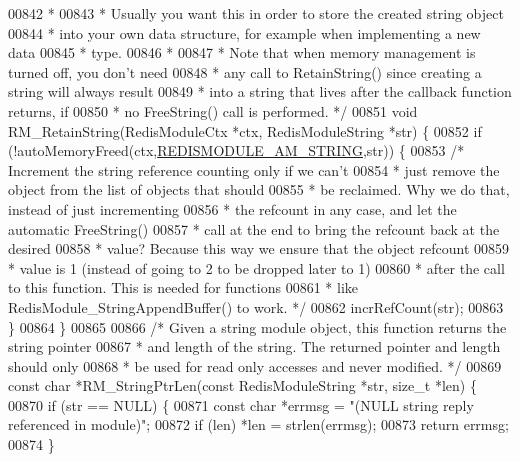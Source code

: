 \begin{DoxyCode}
{00842 \textcolor{comment}{ *}
00843 \textcolor{comment}{ * Usually you want this in order to store the created string object}
00844 \textcolor{comment}{ * into your own data structure, for example when implementing a new data}
00845 \textcolor{comment}{ * type.}
00846 \textcolor{comment}{ *}
00847 \textcolor{comment}{ * Note that when memory management is turned off, you don't need}
00848 \textcolor{comment}{ * any call to RetainString() since creating a string will always result}
00849 \textcolor{comment}{ * into a string that lives after the callback function returns, if}
00850 \textcolor{comment}{ * no FreeString() call is performed. */}
00851 \textcolor{keywordtype}{void} RM\_RetainString(RedisModuleCtx *ctx, RedisModuleString *str) \{
00852     \textcolor{keywordflow}{if} (!autoMemoryFreed(ctx,\hyperlink{module_8c_a566ace39ef8d3d16c3f7d9d6c6b8e4ef}{REDISMODULE\_AM\_STRING},str)) \{
00853         \textcolor{comment}{/* Increment the string reference counting only if we can't}
00854 \textcolor{comment}{         * just remove the object from the list of objects that should}
00855 \textcolor{comment}{         * be reclaimed. Why we do that, instead of just incrementing}
00856 \textcolor{comment}{         * the refcount in any case, and let the automatic FreeString()}
00857 \textcolor{comment}{         * call at the end to bring the refcount back at the desired}
00858 \textcolor{comment}{         * value? Because this way we ensure that the object refcount}
00859 \textcolor{comment}{         * value is 1 (instead of going to 2 to be dropped later to 1)}
00860 \textcolor{comment}{         * after the call to this function. This is needed for functions}
00861 \textcolor{comment}{         * like RedisModule\_StringAppendBuffer() to work. */}
00862         incrRefCount(str);
00863     \}
00864 \}
00865 
00866 \textcolor{comment}{/* Given a string module object, this function returns the string pointer}
00867 \textcolor{comment}{ * and length of the string. The returned pointer and length should only}
00868 \textcolor{comment}{ * be used for read only accesses and never modified. */}
00869 \textcolor{keyword}{const} \textcolor{keywordtype}{char} *RM\_StringPtrLen(\textcolor{keyword}{const} RedisModuleString *str, size\_t *len) \{
00870     \textcolor{keywordflow}{if} (str == NULL) \{
00871         \textcolor{keyword}{const} \textcolor{keywordtype}{char} *errmsg = \textcolor{stringliteral}{"(NULL string reply referenced in module)"};
00872         \textcolor{keywordflow}{if} (len) *len = strlen(errmsg);
00873         \textcolor{keywordflow}{return} errmsg;
00874     \}
}
\end{DoxyCode}
